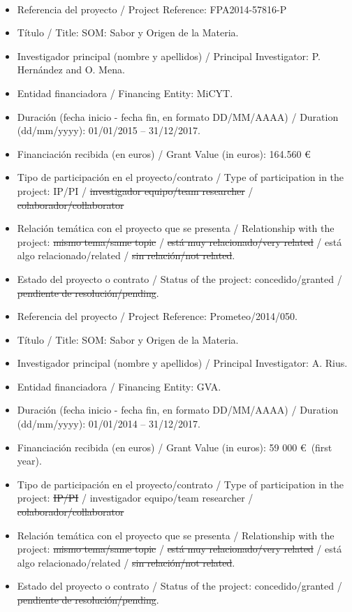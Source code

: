  \\
 \begin{itemize}
\item Referencia del proyecto / Project Reference: FPA2014-57816-P
\item T\'itulo / Title: SOM: Sabor y Origen de la Materia.
\item Investigador principal (nombre y apellidos) / Principal Investigator: P. Hern\'andez and O. Mena.
\item Entidad financiadora / Financing Entity: MiCYT.
\item Duraci\'on (fecha inicio - fecha fin, en formato DD/MM/AAAA) / Duration (dd/mm/yyyy): 01/01/2015 -- 31/12/2017.
\item Financiaci\'on recibida (en euros) / Grant Value (in euros): 164.560 \euro\
\item Tipo de participaci\'on en el proyecto/contrato / Type of participation in the project: IP/PI / \st{investigador equipo/team researcher} / \st{colaborador/collaborator}
\item Relaci\'on tem\'atica con el proyecto que se presenta  /  Relationship with the project: \st{mismo tema/same topic} / \st{est\'a muy relacionado/very related} / est\'a algo relacionado/related / \st{sin relaci\'on/not related}.
\item Estado del proyecto o contrato / Status of the project: concedido/granted   /  \st{pendiente de resoluci\'on/pending}.
\end{itemize}

\vspace{24pt}

\begin{itemize}
\item Referencia del proyecto / Project Reference: Prometeo/2014/050.
\item T\'itulo / Title: SOM: Sabor y Origen de la Materia.
\item Investigador principal (nombre y apellidos) / Principal Investigator: A. Rius.
\item Entidad financiadora / Financing Entity: GVA.
\item Duraci\'on (fecha inicio - fecha fin, en formato DD/MM/AAAA) / Duration (dd/mm/yyyy): 01/01/2014 -- 31/12/2017.
\item Financiaci\'on recibida (en euros) / Grant Value (in euros): 59 000 \euro\ (first year).
\item Tipo de participaci\'on en el proyecto/contrato / Type of participation in the project: \st{IP/PI} / investigador equipo/team researcher / \st{colaborador/collaborator}
\item Relaci\'on tem\'atica con el proyecto que se presenta  /  Relationship with the project: \st{mismo tema/same topic} / \st{est\'a muy relacionado/very related} / est\'a algo relacionado/related / \st{sin relaci\'on/not related}.
\item Estado del proyecto o contrato / Status of the project: concedido/granted   /  \st{pendiente de resoluci\'on/pending}.
\end{itemize}

